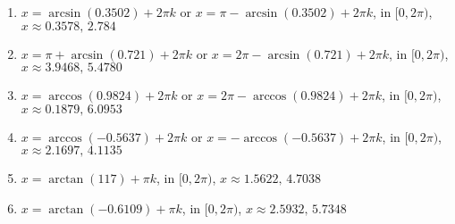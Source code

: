 \documentclass{ximera}
\begin{document}
\begin{enumerate}
\item $x = \arcsin(0.3502) + 2\pi k$ or $x = \pi - \arcsin(0.3502) + 2\pi k$, in  $[0, 2\pi)$, $x \approx 0.3578, \,2.784$

\item $x = \pi + \arcsin(0.721) + 2\pi k$ or $x = 2\pi - \arcsin(0.721) + 2\pi k$, in  $[0, 2\pi)$, $x \approx 3.9468, \, 5.4780$

\item $x = \arccos(0.9824) + 2\pi k$ or $x = 2\pi - \arccos(0.9824) + 2\pi k$, in  $[0, 2\pi)$, $x \approx 0.1879, \, 6.0953$

\item $x = \arccos(-0.5637) + 2\pi k$ or $x = - \arccos(-0.5637)  + 2\pi k$, in  $[0, 2\pi)$, $x \approx 2.1697, \, 4.1135$

\item $x = \arctan(117) + \pi k$, in  $[0, 2\pi)$, $x \approx 1.5622, \, 4.7038$

\item $x =  \arctan(-0.6109) + \pi k$, in  $[0, 2\pi)$, $x \approx 2.5932, \, 5.7348$

\setcounter{HW}{\value{enumi}}

\end{enumerate}
\end{document}
